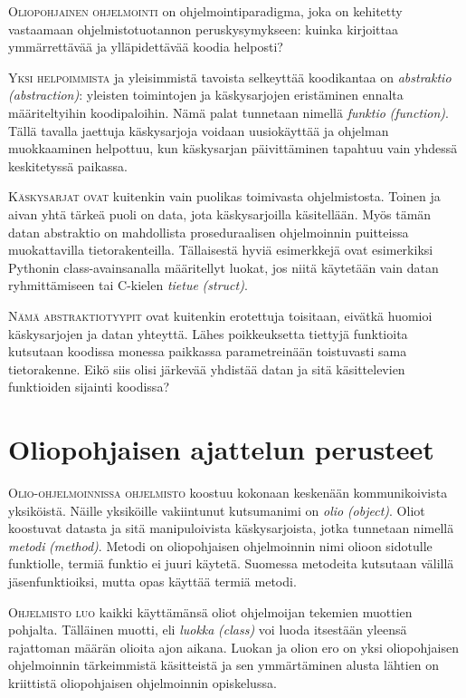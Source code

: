 \documentclass[openany]{book}
\newcommand{\newthought}[1]{\smallskip\textsc{#1}}
\newcommand{\eng}[1]{\textit{(#1)}}
\newcommand{\new}[1]{\textit{\gls{#1}}}
\newcommand{\neweng}[2]{\new{#1} \eng{#2}}
\begin{document}
\newthought{Oliopohjainen ohjelmointi} on ohjelmointiparadigma, joka on kehitetty vastaamaan
ohjelmistotuotannon peruskysymykseen: kuinka kirjoittaa ymmärrettävää ja ylläpidettävää koodia
helposti?

\newthought{Yksi helpoimmista} ja yleisimmistä tavoista selkeyttää koodikantaa on
\neweng{abstraktio}{abstraction}: yleisten toimintojen ja käskysarjojen eristäminen ennalta
määriteltyihin koodipaloihin. Nämä palat tunnetaan nimellä \neweng{funktio}{function}. Tällä
tavalla jaettuja käskysarjoja voidaan uusiokäyttää ja ohjelman muokkaaminen helpottuu, kun
käskysarjan päivittäminen tapahtuu vain yhdessä keskitetyssä paikassa.

\newthought{Käskysarjat ovat} kuitenkin vain puolikas toimivasta ohjelmistosta. Toinen ja aivan
yhtä tärkeä puoli on data, jota käskysarjoilla käsitellään. Myös tämän datan abstraktio on
mahdollista proseduraalisen ohjelmoinnin puitteissa muokattavilla tietorakenteilla. Tällaisestä
hyviä esimerkkejä ovat esimerkiksi Pythonin class-avainsanalla määritellyt luokat, jos niitä
käytetään vain datan ryhmittämiseen tai C-kielen \neweng{tietue}{struct}.

\newthought{Nämä abstraktiotyypit} ovat kuitenkin erotettuja toisitaan, eivätkä huomioi
käskysarjojen ja datan yhteyttä. Lähes poikkeuksetta tiettyjä funktioita kutsutaan koodissa
monessa paikkassa parametreinään toistuvasti sama tietorakenne. Eikö siis olisi järkevää yhdistää
datan ja sitä käsittelevien funktioiden sijainti koodissa?


\section{Oliopohjaisen ajattelun perusteet}
\label{oliopohjaisesta ajattelusta}

\newthought{Olio-ohjelmoinnissa ohjelmisto} koostuu kokonaan keskenään kommunikoivista yksiköistä.
Näille yksiköille vakiintunut kutsumanimi on \neweng{olio}{object}. Oliot koostuvat datasta ja
sitä manipuloivista käskysarjoista, jotka tunnetaan nimellä \neweng{metodi}{method}. Metodi on
oliopohjaisen ohjelmoinnin nimi olioon sidotulle funktiolle, termiä \gls{funktio} ei juuri
käytetä. Suomessa metodeita kutsutaan välillä jäsenfunktioiksi, mutta opas käyttää termiä metodi.

\newthought{Ohjelmisto luo} kaikki käyttämänsä oliot ohjelmoijan tekemien muottien pohjalta.
Tälläinen muotti, eli \neweng{luokka}{class} voi luoda itsestään yleensä rajattoman määrän olioita
ajon aikana. Luokan ja olion ero on yksi oliopohjaisen ohjelmoinnin tärkeimmistä käsitteistä ja
sen ymmärtäminen alusta lähtien on kriittistä oliopohjaisen ohjelmoinnin opiskelussa.
\end{document}
